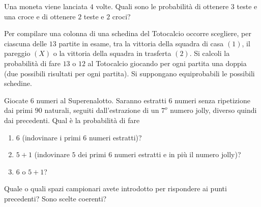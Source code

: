 \Esercizio{}

Una moneta viene lanciata $4$ volte. Quali sono le probabilità di ottenere $3$ teste e una croce e di ottenere $2$ teste e $2$ croci?

\Esercizio{}

Per compilare una colonna di una schedina del Totocalcio occorre scegliere, per ciascuna delle $13$ partite in esame, tra la vittoria della squadra di casa $(1)$, il pareggio $(X)$ o la vittoria della squadra in trasferta $(2)$. Si calcoli la probabilità di fare $13$ o $12$ al Totocalcio giocando per ogni partita una doppia (due possibili risultati per ogni partita). Si suppongano equiprobabili le possibili schedine.

\Esercizio{}

Giocate $6$ numeri al Superenalotto. Saranno estratti $6$ numeri senza ripetizione dai primi $90$ naturali, seguiti dall'estrazione di un $7^{o}$ numero jolly, diverso quindi dai precedenti. Qual è la probabilità di fare
\begin{enumerate}
	\item $6$ (indovinare i primi $6$ numeri estratti)?
	\item $5+1$ (indovinare $5$ dei primi $6$ numeri estratti e in più il numero jolly)?
	\item $6$ o $5+1$?
\end{enumerate}

Quale o quali spazi campionari avete introdotto per rispondere ai punti precedenti? Sono scelte coerenti?

\Esercizio{}


